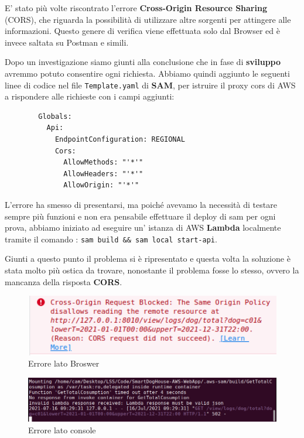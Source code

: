         E' stato più volte riscontrato l'errore \textbf{Cross-Origin Resource Sharing} (CORS), che riguarda la possibilità di utilizzare altre sorgenti per attingere alle informazioni. Questo genere di verifica viene effettuata solo dal Browser ed è invece saltata su Postman e simili.
        
        Dopo un investigazione siamo giunti alla conclusione che in fase di \textbf{sviluppo} avremmo potuto consentire ogni richiesta. Abbiamo quindi aggiunto le seguenti linee di codice nel file \texttt{Template.yaml} di \textbf{SAM},  per istruire il proxy cors di AWS a rispondere alle richieste con i campi aggiunti:
        \begin{lstlisting}
        Globals:
          Api:
            EndpointConfiguration: REGIONAL
            Cors:
              AllowMethods: "'*'"
              AllowHeaders: "'*'"
              AllowOrigin: "'*'"
        \end{lstlisting}
        
        L'errore ha smesso di presentarsi, ma poiché avevamo la necessità di testare sempre più funzioni e non era pensabile effettuare il deploy di sam per ogni prova, abbiamo iniziato ad eseguire un' istanza di AWS \textbf{Lambda} localmente tramite il comando : \texttt{sam build \&\& sam local start-api}.
        
        Giunti a questo punto il problema si è ripresentato e questa volta la soluzione è stata molto più ostica da trovare, nonostante il problema fosse lo stesso, ovvero la mancanza della risposta \textbf{CORS}.

        \begin{figure}[H]
            \caption{Errore lato Broswer}
            \label{fig:ErrorCorsBroswer}
            \centering
            \includegraphics[width=1\textwidth]{Images/CorsErrorFrontEnd.PNG}
        \end{figure}
        
        \begin{figure}[H]
            \caption{Errore lato console}
            \label{fig:ErrorCorsConsole}
            \centering
            \includegraphics[width=1\textwidth]{Images/CorsErrorConsole.PNG}
        \end{figure}
    
